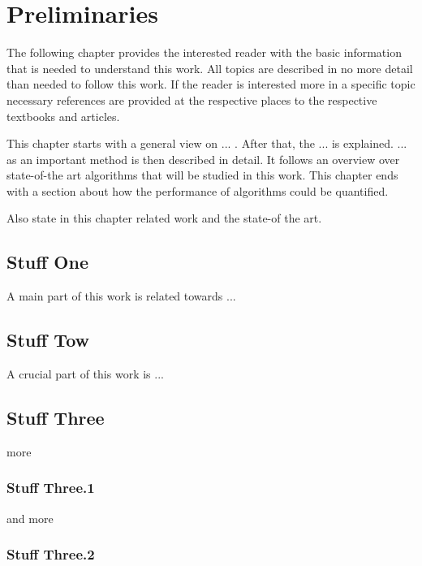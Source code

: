 \chapter{Preliminaries}
\label{c:preliminaries}

The following chapter provides the interested reader with the basic information that is needed to understand this work. All topics are described in no more detail than needed to follow this work. If the reader is interested more in a specific topic necessary references are provided at the respective places to the respective textbooks and articles.

This chapter starts with a general view on ... . After that, the ... is explained. ... as an important method is then described in detail. It follows an overview over state-of-the art algorithms that will be studied in this work. This chapter ends with a section about how the performance of algorithms could be quantified.

Also state in this chapter related work and the state-of the art.

\section{Stuff One}
\label{s:stuff1}

A main part of this work is related towards ...


\section{Stuff Tow}
\label{s:stuff2}

A crucial part of this work is ...



\section{Stuff Three}
\label{s:Stuff 3}

more

\subsection{Stuff Three.1}
\label{ss:stuff31}

and more

\subsection{Stuff Three.2}
\label{ss:stuff3.2}

